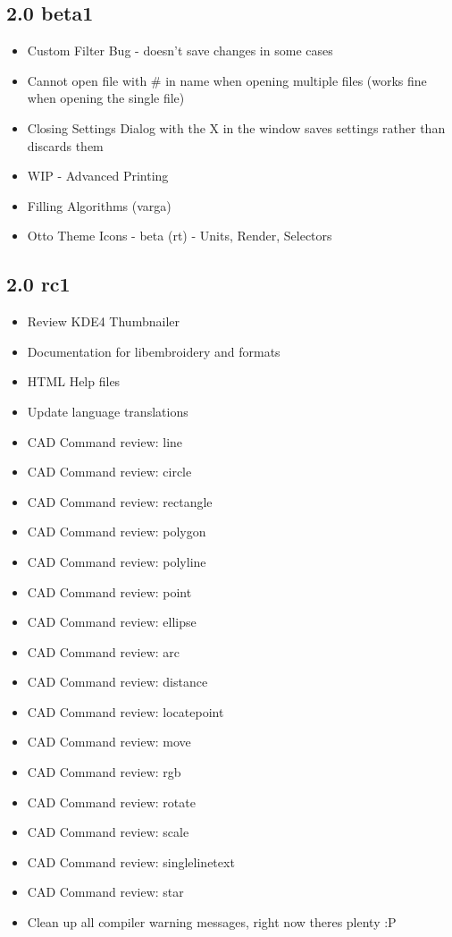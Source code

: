 \documentclass[a4paper]{report}
\begin{document}
\subsection{2.0 beta1}

\begin{itemize}
\item Custom Filter Bug - doesn't save changes in some cases
\item Cannot open file with \# in name when opening multiple files (works fine when opening the single file)
\item Closing Settings Dialog with the X in the window saves settings rather than discards them
\item WIP - Advanced Printing
\item Filling Algorithms (varga)
\item Otto Theme Icons - beta (rt) - Units, Render, Selectors
\end{itemize}

\subsection{2.0 rc1}

\begin{itemize}
\item Review KDE4 Thumbnailer
\item Documentation for libembroidery and formats
\item HTML Help files
\item Update language translations
\item CAD Command review: line
\item CAD Command review: circle
\item CAD Command review: rectangle
\item CAD Command review: polygon
\item CAD Command review: polyline
\item CAD Command review: point
\item CAD Command review: ellipse
\item CAD Command review: arc
\item CAD Command review: distance
\item CAD Command review: locatepoint
\item CAD Command review: move
\item CAD Command review: rgb
\item CAD Command review: rotate
\item CAD Command review: scale
\item CAD Command review: singlelinetext
\item CAD Command review: star
\item Clean up all compiler warning messages, right now theres plenty :P
\end{itemize}
\end{document}
